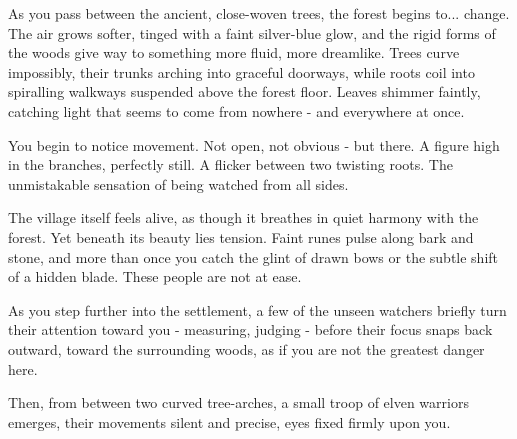 \begin{DndReadAloud}
	As you pass between the ancient, close-woven trees, the forest begins to... change. The air grows softer, tinged with a faint silver-blue glow, and the rigid forms of the woods give way to something more fluid, more dreamlike. Trees curve impossibly, their trunks arching into graceful doorways, while roots coil into spiralling walkways suspended above the forest floor. Leaves shimmer faintly, catching light that seems to come from nowhere - and everywhere at once.

	You begin to notice movement. Not open, not obvious - but there. A figure high in the branches, perfectly still. A flicker between two twisting roots. The unmistakable sensation of being watched from all sides.

	The village itself feels alive, as though it breathes in quiet harmony with the forest. Yet beneath its beauty lies tension. Faint runes pulse along bark and stone, and more than once you catch the glint of drawn bows or the subtle shift of a hidden blade. These people are not at ease.

	As you step further into the settlement, a few of the unseen watchers briefly turn their attention toward you - measuring, judging - before their focus snaps back outward, toward the surrounding woods, as if you are not the greatest danger here.

	Then, from between two curved tree-arches, a small troop of elven warriors emerges, their movements silent and precise, eyes fixed firmly upon you.
\end{DndReadAloud}
